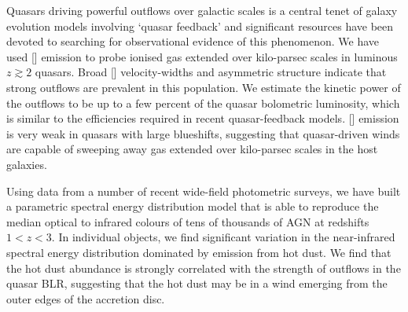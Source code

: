 Quasars driving powerful outflows over galactic scales is a central tenet of galaxy evolution models involving `quasar feedback' and significant resources have been devoted to searching for observational evidence of this phenomenon.  
We have used [] emission to probe ionised gas extended over kilo-parsec scales in luminous $z\gtrsim2$ quasars.
Broad [] velocity-widths and asymmetric structure indicate that strong outflows are prevalent in this population.  
We estimate the kinetic power of the outflows to be up to a few percent of the quasar bolometric luminosity, which is similar to the efficiencies required in recent quasar-feedback models. 
[] emission is very weak in quasars with large  blueshifts, suggesting that quasar-driven winds are capable of sweeping away gas extended over kilo-parsec scales in the host galaxies. 

Using data from a number of recent wide-field photometric surveys, we have built a parametric spectral energy distribution model that is able to reproduce the median optical to infrared colours of tens of thousands of AGN at redshifts $1 < z < 3$. 
In individual objects, we find significant variation in the near-infrared spectral energy distribution dominated by emission from hot dust. 
We find that the hot dust abundance is strongly correlated with the strength of outflows in the quasar BLR, suggesting that the hot dust may be in a wind emerging from the outer edges of the accretion disc. 

\vfill

\endgroup			

\vfill